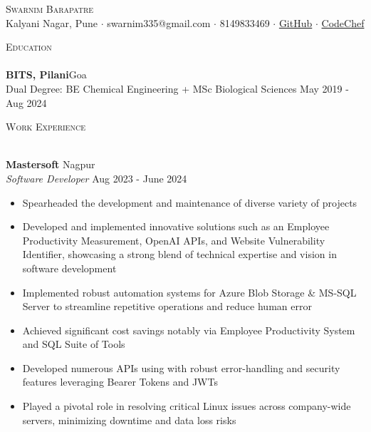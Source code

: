\documentclass[a4paper]{article}
\newcommand{\lineunder} {
\vspace*{-8pt} \\
\hspace*{-18pt} \hrulefill \\
}
\newcommand{\header} [1] {
{\hspace*{-18pt}\vspace*{6pt} \textsc{#1}}
\vspace*{-6pt} \lineunder
}
\begin{document}
\vspace*{-40pt}

\vspace*{-10pt}
\begin{center}
{\Huge \scshape {Swarnim Barapatre}}\\
Kalyani Nagar, Pune $\cdot$ swarnim335@gmail.com $\cdot$ 8149833469 $\cdot$ \href{https://github.com/swarnimcodes/}{GitHub} $\cdot$ \href{https://www.codechef.com/users/b_swarniim}{CodeChef} \\
\end{center}

\header{Education}

\textbf{BITS, Pilani}\hfill Goa\\
Dual Degree: BE Chemical Engineering + MSc Biological Sciences \hfill May 2019 - Aug 2024\\

\vspace{2mm}

\header{Work Experience}
\vspace{1mm}

\textbf{Mastersoft} \hfill Nagpur\\
\textit{Software Developer} \hfill Aug 2023 - June 2024\\
\vspace{-1mm}
\begin{itemize} \itemsep 1pt
\item Spearheaded the development and maintenance of diverse variety of projects
\item Developed and implemented innovative solutions such as an Employee Productivity Measurement, OpenAI APIs, and 
Website Vulnerability Identifier, showcasing a strong blend of technical expertise and vision in software development
\item Implemented robust automation systems for Azure Blob Storage \& MS-SQL Server to streamline repetitive operations and reduce human error
\item Achieved significant cost savings notably via Employee Productivity System and SQL Suite of Tools
\item Developed numerous APIs using with robust error-handling and security features leveraging Bearer Tokens and JWTs
\item Played a pivotal role in resolving critical Linux issues across company-wide servers, minimizing downtime and data loss risks
\end{itemize}
\end{document}
